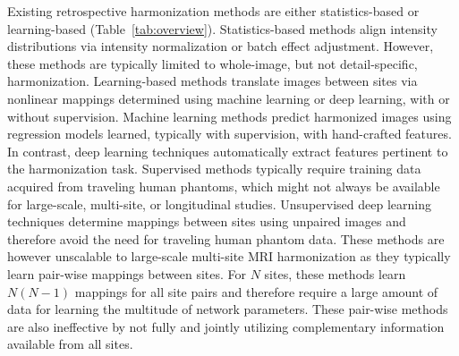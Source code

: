 \documentclass{nature}
\newcommand{\rev}[1]{\textcolor{red}{#1}}
\begin{document}
Existing retrospective harmonization methods are either 
statistics-based or learning-based (Table~\ref{tab:overview}).
%
Statistics-based methods align intensity distributions via intensity normalization\cite{Shah2011Evaluating,Nyul1999On,He2013Intensity,Shinohara2014Statistical,Wrobel2020Intensity} or batch effect adjustment\cite{Fortin2016Removing,Fortin2017Harmonization,Fortin2018Harmonization}.
However, these methods are typically limited to whole-image, but not detail-specific, harmonization.
%
Learning-based methods translate images between sites via nonlinear mappings determined using machine learning\cite{Jog2017Random,Garcia-Dias2020Neuroharmony} or deep learning\cite{Dewey2019Deep,Dewey2020A,Dinsdale2021Deep}, with or without supervision.
Machine learning methods predict harmonized images using regression models learned, typically with supervision,  with hand-crafted features.
In contrast, deep learning techniques automatically extract features pertinent to the harmonization task. Supervised methods typically require training data acquired from traveling human phantoms, which might not always be available for large-scale, multi-site, or longitudinal studies.
Unsupervised deep learning techniques\cite{Liu2017Unsupervised,Zhu2017Toward,Isola2017Image} determine mappings between sites using unpaired images and therefore avoid the need for traveling human phantom data. These methods are however unscalable to large-scale multi-site MRI harmonization as they typically learn pair-wise mappings between sites.
For $N$ sites, these methods learn $N(N-1)$ mappings for all site pairs and therefore require a large amount of data for learning the multitude of network parameters. These pair-wise methods are also ineffective by not fully and jointly utilizing complementary information available from all sites. 
\end{document}
